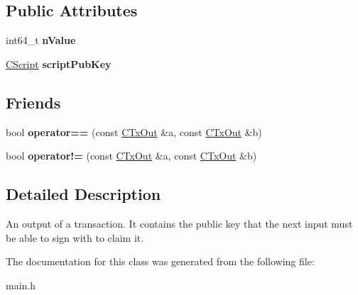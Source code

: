 \subsection*{Public Attributes}
\begin{DoxyCompactItemize}
\item 
\mbox{\label{class_c_tx_out_a2a24354c8275893a9175854c22e7d858}} 
int64\+\_\+t {\bfseries n\+Value}
\item 
\mbox{\label{class_c_tx_out_a25bf3f2f4befb22a6a0be45784fe57e2}} 
\mbox{\hyperlink{class_c_script}{C\+Script}} {\bfseries script\+Pub\+Key}
\end{DoxyCompactItemize}
\subsection*{Friends}
\begin{DoxyCompactItemize}
\item 
\mbox{\label{class_c_tx_out_a7ae3396bfd80108be89eaa97573eb1bb}} 
bool {\bfseries operator==} (const \mbox{\hyperlink{class_c_tx_out}{C\+Tx\+Out}} \&a, const \mbox{\hyperlink{class_c_tx_out}{C\+Tx\+Out}} \&b)
\item 
\mbox{\label{class_c_tx_out_a9657dc95dd3ba8b612baf7a5dd9b2e02}} 
bool {\bfseries operator!=} (const \mbox{\hyperlink{class_c_tx_out}{C\+Tx\+Out}} \&a, const \mbox{\hyperlink{class_c_tx_out}{C\+Tx\+Out}} \&b)
\end{DoxyCompactItemize}


\subsection{Detailed Description}
An output of a transaction. It contains the public key that the next input must be able to sign with to claim it. 

The documentation for this class was generated from the following file\+:\begin{DoxyCompactItemize}
\item 
main.\+h\end{DoxyCompactItemize}
